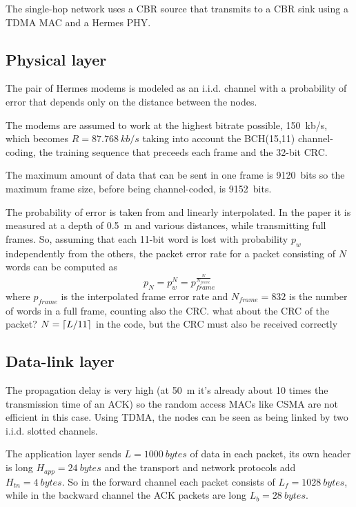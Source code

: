 The single-hop network uses a CBR source that transmits to a CBR sink
using a TDMA MAC and a Hermes PHY.

\subsection{Physical layer}
The pair of Hermes modems is modeled as an i.i.d. channel with a
probability of error that depends only on the distance between the
nodes.

The modems are assumed to work at the highest bitrate
possible, \SI{150}{kb/s}, which becomes $R = \SI{87.768}{kb/s}$ taking
into account the BCH(15,11) channel-coding, the training sequence that
preceeds each frame and the 32-bit CRC.

The maximum amount of data that can be sent in one frame
is \SI{9120}{bits} so the maximum frame size, before being
channel-coded, is \SI{9152}{bits}.

The probability of error is taken from \cite{hermes} and linearly
interpolated. In the paper it is measured at a depth of \SI{0.5}{\m}
and various distances, while transmitting full frames.
%
So, assuming that each 11-bit word is lost with probability $p_w$
independently from the others, the packet error rate for a packet
consisting of $N$ words can be computed as
\begin{equation}
  p_N = p_w^N = p_{frame}^\frac{N}{N_{frame}}
  \label{eq:pN}
\end{equation}
where $p_{frame}$ is the interpolated frame error rate and $N_{frame}
= 832$ is the number of words in a full frame, counting also the CRC.
%
{ \color{red} what about the CRC of the packet? $N = \left\lceil L/11\right\rceil$ in
  the code, but the CRC must also be received correctly}

\subsection{Data-link layer}
The propagation delay is very high (at \SI{50}{\m} it's already about
10 times the transmission time of an ACK) so the random access MACs
like CSMA are not efficient in this case. Using TDMA, the nodes can be
seen as being linked by two i.i.d. slotted channels.

The application layer sends $L=\SI{1000}{bytes}$ of data in each
packet, its own header is long $H_{app} = \SI{24}{bytes}$ and the
transport and network protocols add $H_{tn} = \SI{4}{bytes}$. So in
the forward channel each packet consists of $L_f = \SI{1028}{bytes}$,
while in the backward channel the ACK packets are long $L_b
= \SI{28}{bytes}$.

